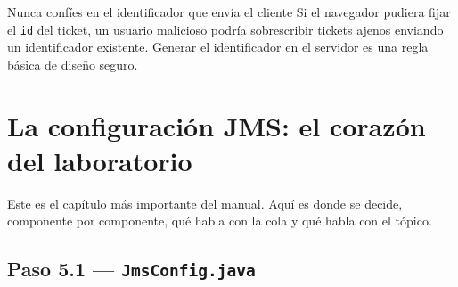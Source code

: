 \documentclass[11pt,a4paper]{book}
\begin{document}
\begin{cajaTip}{Nunca confíes en el identificador que envía el cliente}
	Si el navegador pudiera fijar el \texttt{id} del ticket, un usuario malicioso podría sobrescribir tickets ajenos enviando un identificador existente.
	Generar el identificador en el servidor es una regla básica de diseño seguro.
\end{cajaTip}

\chapter{La configuración JMS: el corazón del laboratorio}
\label{cap:jmsconfig}

Este es el capítulo más importante del manual.
Aquí es donde se decide, componente por componente, qué habla con la cola y qué habla con el tópico.

\section{Paso 5.1 --- \texttt{JmsConfig.java}}
\end{document}
